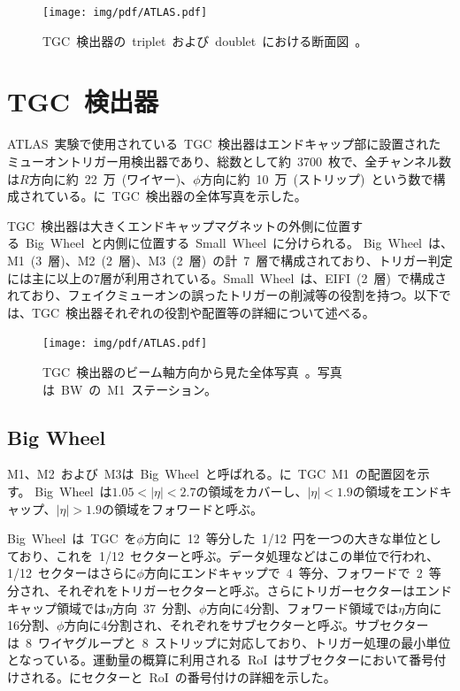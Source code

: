 \begin{figure}[tbp]
        \centering   
        \texttt{[image: img/pdf/ATLAS.pdf]}
        \caption[TGC~検出器の~triplet~および~doublet~における断面図]{TGC~検出器の~triplet~および~doublet~における断面図~\cite{TR:01}。}\label{fig:TGCpri}
\end{figure}

\section{TGC~検出器}
ATLAS~実験で使用されている~TGC~検出器はエンドキャップ部に設置されたミューオントリガー用検出器であり、総数として約~3700~枚で、全チャンネル数は$R$方向に約~22~万~(ワイヤー)、$\phi$方向に約~10~万~(ストリップ)~という数で構成されている。に~TGC~検出器の全体写真を示した。

TGC~検出器は大きくエンドキャップマグネットの外側に位置する~Big~Wheel~と内側に位置する~Small~Wheel~に分けられる。
Big~Wheel~は、M1~(3~層)、M2~(2~層)、M3~(2~層)~の計~7~層で構成されており、トリガー判定には主に以上の7層が利用されている。Small~Wheel~は、EIFI~(2~層)~で構成されており、フェイクミューオンの誤ったトリガーの削減等の役割を持つ。以下では、TGC~検出器それぞれの役割や配置等の詳細について述べる。

\begin{figure}[tbp]
    \centering   
    \texttt{[image: img/pdf/ATLAS.pdf]}
    \caption[TGC 検出器のビーム軸方向から見た全体写真]{TGC~検出器のビーム軸方向から見た全体写真~\cite{TR:01}。写真は~BW~の~M1~ステーション。}\label{fig:tgc00}
\end{figure}

\subsection{Big Wheel}
M1、M2~および~M3は~Big~Wheel~と呼ばれる。に~TGC~M1~の配置図を示す。
Big~Wheel~は$1.05<|\eta|<2.7$の領域をカバーし、$|\eta|<1.9$の領域をエンドキャップ、$|\eta|>1.9$の領域をフォワードと呼ぶ。

Big~Wheel~は~TGC~を$\phi$方向に~12~等分した~1/12~円を一つの大きな単位としており、これを~1/12~セクターと呼ぶ。データ処理などはこの単位で行われ、1/12~セクターはさらに$\phi$方向にエンドキャップで~4~等分、フォワードで~2~等分され、それぞれをトリガーセクターと呼ぶ。さらにトリガーセクターはエンドキャップ領域では$\eta$方向~37~分割、$\phi$方向に4分割、フォワード領域では$\eta$方向に16分割、$\phi$方向に4分割され、それぞれをサブセクターと呼ぶ。サブセクターは~8~ワイヤグループと~8~ストリップに対応しており、トリガー処理の最小単位となっている。運動量の概算に利用される~RoI~はサブセクターにおいて番号付けされる。にセクターと~RoI~の番号付けの詳細を示した。

